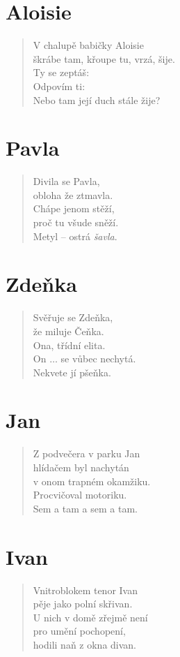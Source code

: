 \section*{Aloisie}
\begin{verse}
V chalupě babičky Aloisie\\
škrábe tam, křoupe tu, vrzá, šije.\\
Ty se zeptáš: \\
Odpovím ti: \\
Nebo tam její duch stále žije?
\end{verse}

\section*{Pavla}
\begin{verse}
Divila se Pavla,\\
obloha že ztmavla.\\
Chápe jenom stěží,\\
proč tu všude sněží.\\
Metyl -- ostrá \textit{šavla}.
\end{verse}

\section*{Zdeňka}
\begin{verse}
Svěřuje se Zdeňka,\\
že miluje Čeňka.\\
Ona, třídní elita.\\
On $\ldots$ se vůbec nechytá.\\
Nekvete jí pšeňka.
\end{verse}

\section*{Jan}
\begin{verse}
Z podvečera v parku Jan\\
hlídačem byl nachytán\\
v onom trapném okamžiku.\\
Procvičoval motoriku.\\
Sem a tam a sem a tam.
\end{verse}

\section*{Ivan}
\begin{verse}
Vnitroblokem tenor Ivan\\
pěje jako polní skřivan.\\
U nich v domě zřejmě není\\
pro umění pochopení,\\
hodili naň z okna divan.
\end{verse}

